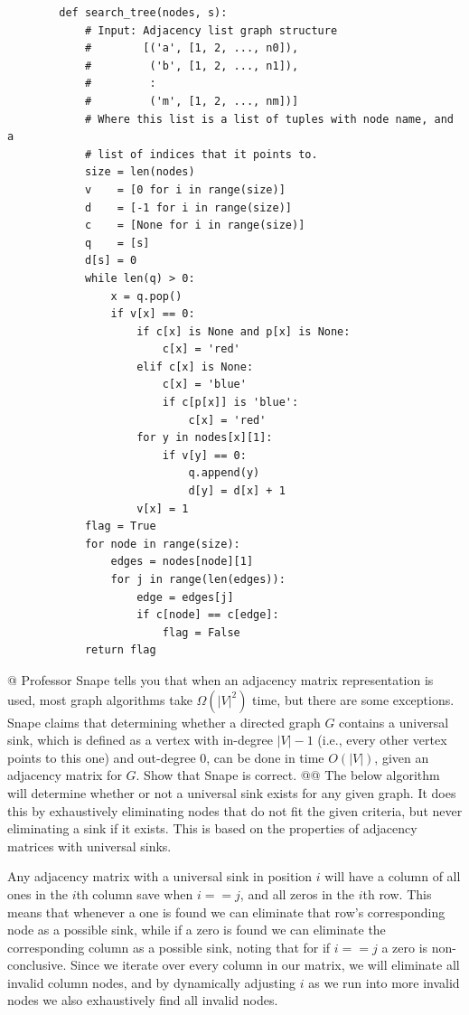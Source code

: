 \documentclass[10pt]{article}
\begin{document}
\begin{easylist}[enumerate]
    \begin{lstlisting}
        def search_tree(nodes, s):
            # Input: Adjacency list graph structure
            #        [('a', [1, 2, ..., n0]),
            #         ('b', [1, 2, ..., n1]),
            #         :
            #         ('m', [1, 2, ..., nm])]
            # Where this list is a list of tuples with node name, and a
            # list of indices that it points to.
            size = len(nodes)
            v    = [0 for i in range(size)]
            d    = [-1 for i in range(size)]
            c    = [None for i in range(size)]
            q    = [s]
            d[s] = 0
            while len(q) > 0:
                x = q.pop()
                if v[x] == 0:
                    if c[x] is None and p[x] is None:
                        c[x] = 'red'
                    elif c[x] is None:
                        c[x] = 'blue'
                        if c[p[x]] is 'blue':
                            c[x] = 'red'
                    for y in nodes[x][1]:
                        if v[y] == 0:
                            q.append(y)
                            d[y] = d[x] + 1
                    v[x] = 1
            flag = True
            for node in range(size):
                edges = nodes[node][1]
                for j in range(len(edges)):
                    edge = edges[j]
                    if c[node] == c[edge]:
                        flag = False
            return flag
    \end{lstlisting}

    @ Professor Snape tells you that when an adjacency matrix representation is used, most graph algorithms take
    $\Omega(|V|^2)$ time, but there are some exceptions. Snape claims that determining whether a directed graph $G$
    contains a universal sink, which is defined as a vertex with in-degree $|V| - 1$ (i.e., every other vertex points to
    this one) and out-degree 0, can be done in time $O(|V|)$, given an adjacency matrix for $G$. Show that Snape is
    correct.
    @@ The below algorithm will determine whether or not a universal sink exists for any given graph. It does this by
    exhaustively eliminating nodes that do not fit the given criteria, but never eliminating a sink if it exists. This
    is based on the properties of adjacency matrices with universal sinks.\newline
    
    Any adjacency matrix with a universal sink in position $i$ will have a column of all ones in the $i$th column save when $i == j$, and all zeros in the $i$th row. This means that whenever a one is found we can eliminate that row's corresponding node as a possible sink, while if a zero is found we can eliminate the corresponding column as a possible sink, noting that for if $i == j$ a zero is non-conclusive. Since we iterate over every column in our matrix, we will eliminate all invalid column nodes, and by dynamically adjusting $i$ as we run into more invalid nodes we also exhaustively find all invalid nodes.
    

\end{easylist}
\end{document}
